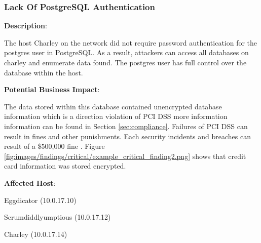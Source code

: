 \subsubsection{Lack Of PostgreSQL Authentication}
\label{sec:creds}
\noindent


\noindent


\color{black}{}
\textbf{Description}:

The host Charley on the network did not require password authentication for the postgres user in PostgreSQL. As a result, attackers can access all databases on charley and enumerate data found. The postgres user has full control over the database within the host.


\noindent
\textbf{Potential Business Impact}:

The data stored within this database contained unencrypted database information which is a direction violation of PCI DSS more information information can be found in Section \ref{sec:compliance}. Failures of PCI DSS can result in fines and other punishments. Each security incidents and breaches can result of a \$500,000 fine \cite{pcidssfineexample}. Figure \ref{fig:images/findings/critical/example_critical_finding2.png} shows that credit card information was stored encrypted.



\noindent
\textbf{Affected Host}:

    Eggdicator (10.0.17.10)
    
    Scrumdiddlyumptious (10.0.17.12)
    
    Charley (10.0.17.14)

